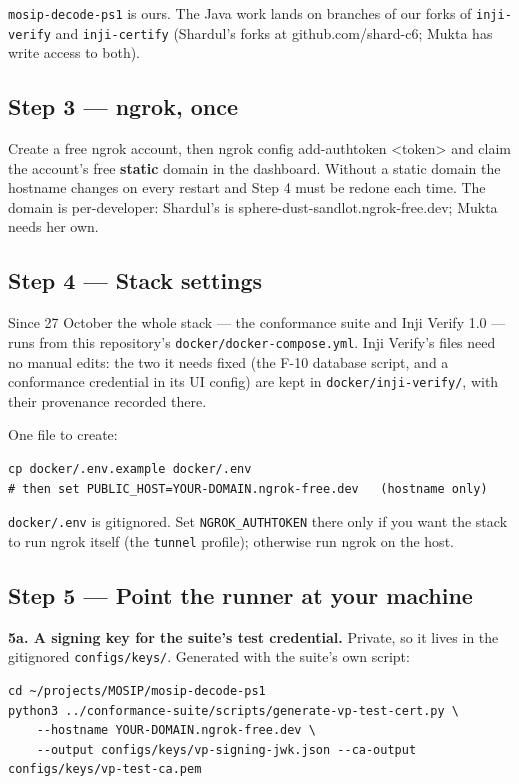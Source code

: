 \documentclass[10pt,a4paper]{article}
\newcommand{\us}{\_}
\newcommand{\cmd}[1]{\colorbox{box}{#1}}
\begin{document}
\texttt{mosip-decode-ps1} is ours. The Java work lands on branches of our forks of
\texttt{inji-verify} and \texttt{inji-certify} (Shardul's forks at
github.com/shard-c6; Mukta has write access to both).

\subsection{Step 3 --- ngrok, once}

Create a free ngrok account, then \cmd{ngrok config add-authtoken <token>} and claim the
account's free \textbf{static} domain in the dashboard. Without a static domain the
hostname changes on every restart and Step 4 must be redone each time. The domain is
per-developer: Shardul's is sphere-dust-sandlot.ngrok-free.dev; Mukta needs her own.

\subsection{Step 4 --- Stack settings}

Since 27 October the whole stack --- the conformance suite and Inji Verify 1.0 --- runs from
this repository's \texttt{docker/docker-compose.yml}. Inji Verify's files need no manual
edits: the two it needs fixed (the F-10 database script, and a conformance credential in its
UI config) are kept in \texttt{docker/inji-verify/}, with their provenance recorded there.

One file to create:

\begin{verbatim}
cp docker/.env.example docker/.env
# then set PUBLIC_HOST=YOUR-DOMAIN.ngrok-free.dev   (hostname only)
\end{verbatim}

\texttt{docker/.env} is gitignored. Set \texttt{NGROK\us{}AUTHTOKEN} there only if you want the
stack to run ngrok itself (the \texttt{tunnel} profile); otherwise run ngrok on the host.

\subsection{Step 5 --- Point the runner at your machine}

\textbf{5a. A signing key for the suite's test credential.} Private, so it lives in the
gitignored \texttt{configs/keys/}. Generated with the suite's own script:

\begin{verbatim}
cd ~/projects/MOSIP/mosip-decode-ps1
python3 ../conformance-suite/scripts/generate-vp-test-cert.py \
    --hostname YOUR-DOMAIN.ngrok-free.dev \
    --output configs/keys/vp-signing-jwk.json --ca-output configs/keys/vp-test-ca.pem
\end{verbatim}
\end{document}
